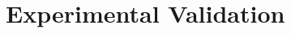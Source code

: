 \documentclass[10pt,twocolumn,letterpaper]{article}
\begin{document}


\section{Experimental Validation}


\end{document}
